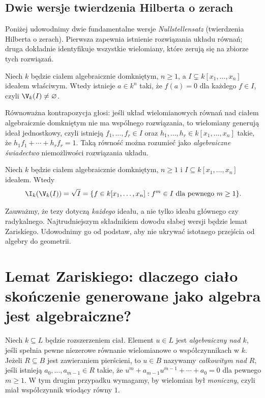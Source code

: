 \subsection{Dwie wersje twierdzenia Hilberta o zerach}

Poniżej udowodnimy dwie fundamentalne wersje
\emph{Nullstellensatz} (twierdzenia Hilberta o zerach).
Pierwsza zapewnia istnienie rozwiązania układu równań;
druga dokładnie identyfikuje wszystkie wielomiany, które
zerują się na zbiorze tych rozwiązań.

\begin{twierdzenie}
\label{tw:weak-NS}
Niech $k$ będzie ciałem algebraicznie domkniętym,
$n\ge1$, a $I\subsetneq k[x_1,\dots,x_n]$ ideałem właściwym.
Wtedy istnieje $a\in k^n$ taki, że $f(a)=0$ dla każdego $f\in I$,
czyli $\V_k(I)\ne\varnothing$.
\end{twierdzenie}

Równoważna kontrapozycja głosi: jeśli układ wielomianowych
równań nad ciałem algebraicznie domkniętym nie ma wspólnego
rozwiązania, to wielomiany generują ideał jednostkowy, czyli
istnieją $f_1,\dots,f_r\in I$ oraz
$h_1,\dots,h_r\in k[x_1,\dots,x_n]$ takie, że
$h_1f_1+\cdots+h_rf_r=1$.
Taką równość można rozumieć jako \emph{algebraiczne świadectwo}
niemożliwości rozwiązania układu.

\begin{twierdzenie}
\label{tw:strong-NS}
Niech $k$ będzie ciałem algebraicznie domkniętym,
$n\ge1$ i $I\subseteq k[x_1,\dots,x_n]$ ideałem.
Wtedy
\[
\I_k(\V_k(I))=\sqrt I
=\{f\in k[x_1,\dots,x_n]:f^m\in I\text{ dla pewnego }m\ge1\}.
\]
\end{twierdzenie}

Zauważmy, że tezy dotyczą \emph{każdego} ideału,
a nie tylko ideału głównego czy radykalnego. Najtrudniejszym
składnikiem dowodu słabej wersji będzie lemat Zariskiego.
Udowodnimy go od podstaw, aby nie ukrywać istotnego przejścia
od algebry do geometrii.

\section{Lemat Zariskiego: dlaczego ciało skończenie generowane jako algebra jest algebraiczne?}

\begin{definicja}
Niech $k\subseteq L$ będzie rozszerzeniem ciał. Element $u\in L$
jest \emph{algebraiczny nad $k$}, jeśli spełnia pewne niezerowe
równanie wielomianowe o współczynnikach w $k$.
Jeżeli $R\subseteq B$ jest zawieraniem pierścieni, to $u\in B$
nazywamy \emph{całkowitym nad $R$}, jeśli istnieją
$a_0,\dots,a_{m-1}\in R$ takie, że
$u^m+a_{m-1}u^{m-1}+\cdots+a_0=0$ dla pewnego $m\ge1$.
W tym drugim przypadku wymagamy, by wielomian był \emph{moniczny},
czyli miał współczynnik wiodący równy $1$.
\end{definicja}

